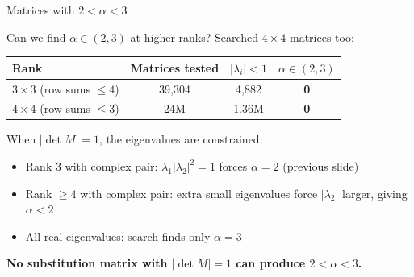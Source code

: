 \documentclass[aspectratio=169, 11pt]{beamer}
\begin{document}
\begin{frame}{Matrices with $2<\alpha<3$}

Can we find $\alpha\in(2,3)$ at higher ranks? Searched $4\times4$ matrices too:

\medskip
\begin{tabular}{lccc}
\toprule
\textbf{Rank} & \textbf{Matrices tested} & \textbf{$|\lambda_i|<1$} & \textbf{$\alpha\in(2,3)$} \\
\midrule
$3\times3$ (row sums $\leq4$) & 39,304  & 4,882   & \textbf{0} \\
$4\times4$ (row sums $\leq3$) & 24M     & 1.36M   & \textbf{0} \\
\bottomrule
\end{tabular}

\bigskip
\flushleft
When $|\det M|=1$, the eigenvalues are constrained:
\begin{itemize}
  \item Rank 3 with complex pair: $\lambda_1|\lambda_2|^2 = 1$ forces $\alpha=2$ (previous slide)
  \item Rank $\geq\!4$ with complex pair: extra small eigenvalues force $|\lambda_2|$ larger, giving $\alpha < 2$
  \item All real eigenvalues: search finds only $\alpha=3$
\end{itemize}

\bigskip
\colorbox{proofbg}{\parbox{0.94\linewidth}{\centering
  \textbf{No substitution matrix with $|\det M|=1$ can produce $2<\alpha<3$.}
}}
\end{frame}
\note{
}
\end{document}
